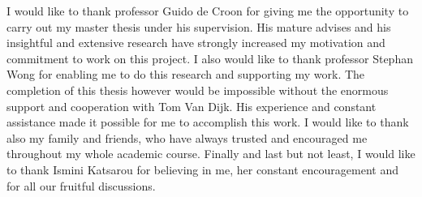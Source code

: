 

\vskip 1cm

I would like to thank professor Guido de Croon for giving me the opportunity to carry out my master thesis under his supervision. His mature advises and his insightful and extensive research have strongly increased my motivation and commitment to work on this project. I also would like to thank professor Stephan Wong for enabling me to do this research and supporting my work. The completion of this thesis however would be impossible without the enormous support and cooperation with Tom Van Dijk. His experience and constant assistance made it possible for me to accomplish this work. I would like to thank also my family and friends, who have always trusted and encouraged me throughout my whole academic course. Finally and last but not least, I would like to thank Ismini Katsarou for believing in me, her constant encouragement and for all our fruitful discussions.



\vskip 2cm
\noindent \AUTHOR \\
\PLACE \\
\DATE

